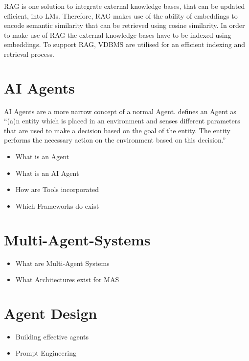 \documentclass[a4paper,oneside,bibliography=totoc]{scrbook}
\begin{document}
\ac{RAG} is one solution to integrate external knowledge bases, that can be updated efficient, into \acp{LM}. Therefore, \ac{RAG} makes use of the ability of embeddings to encode semantic similarity that can be retrieved using cosine similarity. In order to make use of \ac{RAG} the external knowledge bases have to be indexed using embeddings. To support \ac{RAG}, \ac{VDBMS} are utilised for an efficient indexing and retrieval process.

\section{AI Agents}
\label{sec:ai_agents}

AI Agents are a more narrow concept of a normal Agent. \citet{Dorri2018} defines an Agent as \enquote{(a)n entity which is placed in an environment and senses different parameters that are used to make a decision based on the goal of the entity. The entity performs the necessary action on the environment based on this decision.} \cite[S. 28574]{Dorri2018}

\begin{itemize}
  \item What is an Agent
  \item What is an AI Agent
  \item How are Tools incorporated
  \item Which Frameworks do exist
\end{itemize}
\section{Multi-Agent-Systems}
\label{sec:multi_agent_systems}
\begin{itemize}
  \item What are Multi-Agent Systems
  \item What Architectures exist for MAS
\end{itemize}
\section{Agent Design}
\label{sec:agent_design}
\begin{itemize}
  \item Building effective agents \cite{Anthropic2024}
  \item Prompt Engineering \cite{Schulhoff2025}
\end{itemize}
\end{document}
